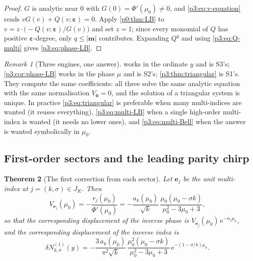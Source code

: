 \documentclass[11pt,a4paper,oneside]{book}
\theoremstyle{plain}
\newtheorem{theorem}{Theorem}[chapter]
\theoremstyle{definition}
\theoremstyle{remark}
\newtheorem{remark}[theorem]{Remark}
\newcommand{\e}{\mathrm{e}}
\begin{document}
\begin{proof}
$G$ is analytic near $0$ with $G(0)=\Phi'(\mu_{0})\ne0$, and \cref{p3:eq:v-equation} reads
$vG(v)+Q(v;\boldsymbol\varepsilon)=0$. Apply \cref{p0:thm:LB} to
$v=z\cdot\bigl(-Q(v;\boldsymbol\varepsilon)/G(v)\bigr)$ and set $z=1$; since every monomial of $Q$
has positive $\boldsymbol\varepsilon$-degree, only $q\le|\boldsymbol m|$ contributes. Expanding
$Q^{q}$ and using \cref{p3:eq:Q-multi} gives \cref{p3:eq:phase-LB}.
\end{proof}

\begin{remark}[Three engines, one answer]
 works in the ordinate $y$ and is S3's; \cref{p3:cor:phase-LB} works in
the phase $\mu$ and is S2's; \cref{p3:thm:triangular} is S1's. They compute the same coefficients:
all three solve the same analytic equation with the same normalisation $V_{\boldsymbol 0}=0$, and
the solution of a triangular system is unique. In practice \cref{p3:eq:triangular} is preferable
when many multi-indices are wanted (it reuses everything), \cref{p3:eq:multi-LB} when a single
high-order multi-index is wanted (it needs no lower ones), and \cref{p3:eq:multi-Bell} when the
answer is wanted symbolically in $\mu_{0}$.
\end{remark}

\subsection{First-order sectors and the leading parity chirp}
\label{p3:sub:first-order}

\begin{theorem}[The first correction from each sector]\label{p3:thm:first-order}
Let $\boldsymbol e_{j}$ be the unit multi-index at $j=(k,\sigma)\in J_{K}$. Then
\begin{equation}\label{p3:eq:first-V}
 V_{\boldsymbol e_{j}}(\mu_{0})=-\frac{r_{j}(\mu_{0})}{\Phi'(\mu_{0})}
 =-\frac{a_{k}(\mu_{0})}{\sqrt k}\,
 \frac{\mu_{0}(\mu_{0}-\sigma k)}{\mu_{0}^{2}-3\mu_{0}+3},
\end{equation}
so that the corresponding displacement of the inverse phase is $V_{\boldsymbol
e_{j}}(\mu_{0})\,\e^{-\alpha_{j}\mu_{0}}$, and the corresponding displacement of the inverse index
is
\begin{equation}\label{p3:eq:first-N}
 \delta N^{(1)}_{k,\sigma}(y)
 =-\frac{3\,a_{k}(\mu_{0})}{\pi^{2}\sqrt k}\,
 \frac{\mu_{0}^{2}(\mu_{0}-\sigma k)}{\mu_{0}^{2}-3\mu_{0}+3}\,
 \e^{-(1-\sigma/k)\mu_{0}} .
\end{equation}
\end{theorem}
\end{document}
